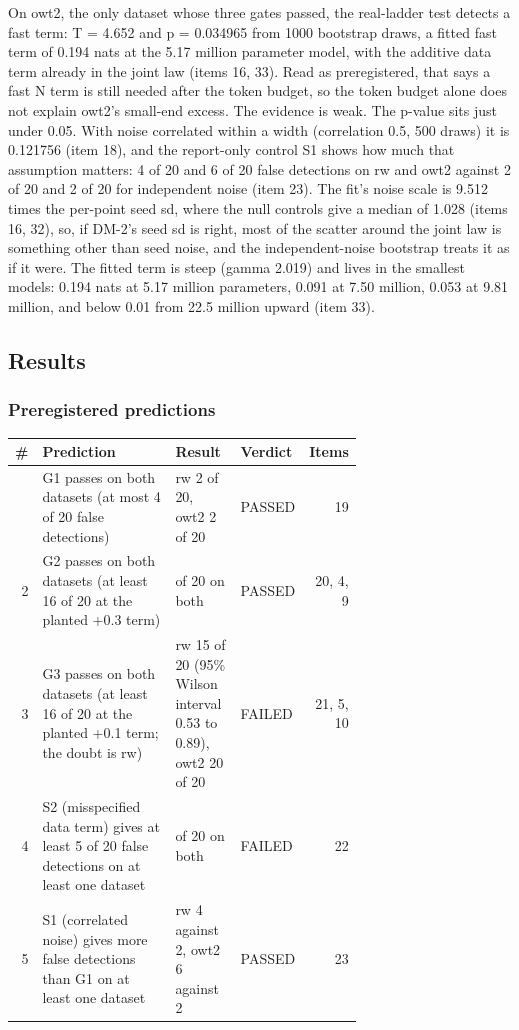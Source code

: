 On owt2, the only dataset whose three gates passed, the real-ladder test detects a fast term: T = 4.652 and p = 0.034965 from 1000 bootstrap draws, a fitted fast term of 0.194 nats at the 5.17 million parameter model, with the additive data term already in the joint law (items 16, 33). Read as preregistered, that says a fast N term is still needed after the token budget, so the token budget alone does not explain owt2's small-end excess. The evidence is weak. The p-value sits just under 0.05. With noise correlated within a width (correlation 0.5, 500 draws) it is 0.121756 (item 18), and the report-only control S1 shows how much that assumption matters: 4 of 20 and 6 of 20 false detections on rw and owt2 against 2 of 20 and 2 of 20 for independent noise (item 23). The fit's noise scale is 9.512 times the per-point seed sd, where the null controls give a median of 1.028 (items 16, 32), so, if DM-2's seed sd is right, most of the scatter around the joint law is something other than seed noise, and the independent-noise bootstrap treats it as if it were. The fitted term is steep (gamma 2.019) and lives in the smallest models: 0.194 nats at 5.17 million parameters, 0.091 at 7.50 million, 0.053 at 9.81 million, and below 0.01 from 22.5 million upward (item 33).


\subsection*{Results}
\subsubsection*{Preregistered predictions}

{\footnotesize
\begin{longtable}{r>{\raggedright\arraybackslash}p{0.485\linewidth}>{\raggedright\arraybackslash}p{0.205\linewidth}lr}
\toprule
\textbf{\#} & \textbf{Prediction} & \textbf{Result} & \textbf{Verdict} & \textbf{Items} \\
\midrule
\endhead
\bottomrule
\endfoot
1 & G1 passes on both datasets (at most 4 of 20 false detections) & rw 2 of 20, owt2 2 of 20 & PASSED & 19 \\
2 & G2 passes on both datasets (at least 16 of 20 at the planted +0.3 term) & 20 of 20 on both & PASSED & 20, 4, 9 \\
3 & G3 passes on both datasets (at least 16 of 20 at the planted +0.1 term; the doubt is rw) & rw 15 of 20 (95\% Wilson interval 0.53 to 0.89), owt2 20 of 20 & FAILED & 21, 5, 10 \\
4 & S2 (misspecified data term) gives at least 5 of 20 false detections on at least one dataset & 0 of 20 on both & FAILED & 22 \\
5 & S1 (correlated noise) gives more false detections than G1 on at least one dataset & rw 4 against 2, owt2 6 against 2 & PASSED & 23 \\
\end{longtable}
}

